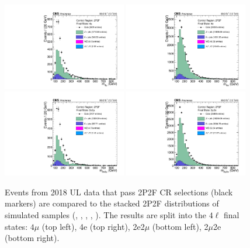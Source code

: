 \begin{figure}[!htbp]
	\begin{center}
		\includegraphics[width=0.48\textwidth]{figures/higgsmassmeas/redbkg/cr/UL2018_CR_2P2F_4mu.pdf}
		\includegraphics[width=0.48\textwidth]{figures/higgsmassmeas/redbkg/cr/UL2018_CR_2P2F_4e.pdf}
		\includegraphics[width=0.48\textwidth]{figures/higgsmassmeas/redbkg/cr/UL2018_CR_2P2F_2e2mu.pdf}
		\includegraphics[width=0.48\textwidth]{figures/higgsmassmeas/redbkg/cr/UL2018_CR_2P2F_2mu2e.pdf}
		\caption{
			Events from 2018 UL data that pass 2P2F CR selections (black markers) 
			are compared to the stacked 2P2F distributions of simulated samples
			(\Zplusjets, \ttbarplusjets, \WZ, \Zgammastar, \ZZ).
			The results are split into the $4\ell$ final states:
			$4\mu$ (top left), 4e (top right), 2e2$\mu$ (bottom left), 2$\mu$2e (bottom right).
		}
		\label{cr_plots_2p2f_2018}
	\end{center}
\end{figure}
